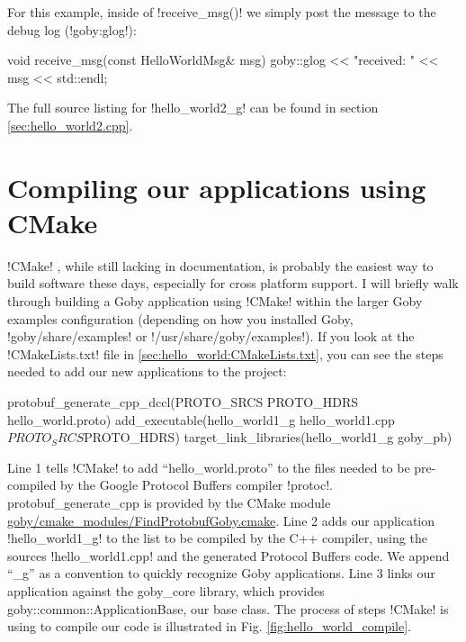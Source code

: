 For this example, inside of !receive_msg()! we simply post the message to the debug log (!goby:glog!):

\begin{boxedverbatim}
void receive_msg(const HelloWorldMsg& msg)
{
   goby::glog << "received: " << msg << std::endl;
}
\end{boxedverbatim}
\resetbvlinenumber

The full source listing for !hello_world2_g! can be found in section \ref{sec:hello_world2.cpp}.

\section{Compiling our applications using CMake}

!CMake! \cite{cmake}, while still lacking in documentation, is probably the easiest way to build software these days, especially for cross platform support. I will briefly walk through building a Goby application using !CMake! within the larger Goby examples configuration (depending on how you installed Goby, !goby/share/examples! or !/usr/share/goby/examples!). If you look at the !CMakeLists.txt! file in \ref{sec:hello_world:CMakeLists.txt}, you can see the steps needed to add our new applications to the project:

\begin{boxedverbatim}
protobuf_generate_cpp_dccl(PROTO_SRCS PROTO_HDRS hello_world.proto)
add_executable(hello_world1_g hello_world1.cpp ${PROTO_SRCS} ${PROTO_HDRS})
target_link_libraries(hello_world1_g goby_pb)
\end{boxedverbatim}
\resetbvlinenumber

Line 1 tells !CMake! to add ``hello\_world.proto'' to the files needed to be pre-compiled by the Google Protocol Buffers compiler !protoc!. protobuf\_generate\_cpp is provided by the CMake module \href{http://bazaar.launchpad.net/~goby-dev/goby/trunk/annotate/head:/cmake_modules/FindProtobufGoby.cmake}{goby/cmake\_modules/FindProtobufGoby.cmake}. Line 2 adds our application !hello_world1_g! to the list to be compiled by the C++ compiler, using the sources !hello_world1.cpp! and the generated Protocol Buffers code. We append ``\_g'' as a convention to quickly recognize Goby applications. Line 3 links our application against the goby\_core library, which provides goby::common::ApplicationBase, our base class. The process of steps !CMake! is using to compile our code is illustrated in Fig. \ref{fig:hello_world_compile}.

